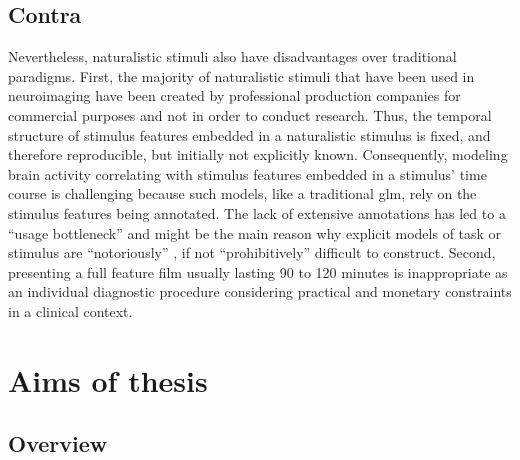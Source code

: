 

\subsection{Contra}
Nevertheless, naturalistic stimuli also have disadvantages over traditional
paradigms.
First, the majority of naturalistic stimuli that have been used in neuroimaging
have been created by professional production companies for commercial purposes
and not in order to conduct research.
Thus, the temporal structure of stimulus features embedded in a naturalistic
stimulus is fixed, and therefore reproducible, but initially not explicitly
known.
Consequently, modeling brain activity correlating with stimulus features
embedded in a stimulus' time course is challenging
\citep{saarimaki2021naturalistic, simony2020analysis} because such models, like
a traditional \ac{glm}, rely on the stimulus features being annotated.
The lack of extensive annotations has led to a ``usage bottleneck''
\citep{aliko2020naturalistic} and might be the main reason why explicit models
of task or stimulus are ``notoriously'' \citep{richard2019fast}, if not
``prohibitively'' \citep{nastase2019measuring} difficult to construct.
Second, presenting a full feature film usually lasting 90 to 120 minutes is
inappropriate as an individual diagnostic procedure considering practical and
monetary constraints in a clinical context.


\section{Aims of thesis}



\subsection{Overview}



